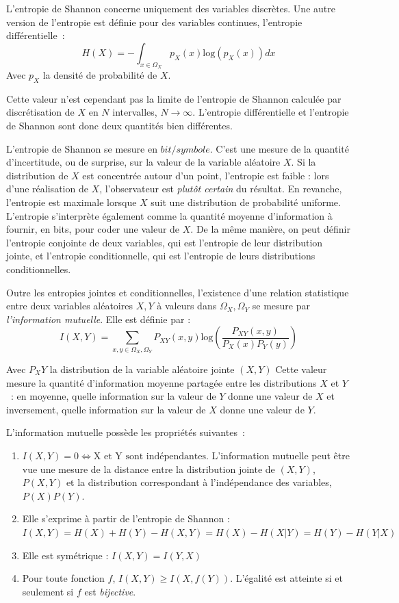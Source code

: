 \documentclass[../main]{subfiles}
\begin{document}
L'entropie de Shannon concerne uniquement des variables discrètes.
Une autre version de l'entropie est définie pour des variables continues, l'entropie différentielle~:
\begin{equation}
    H(X) = - \int_{x \in \Omega_X}{p_X(x)\textrm{log}(p_X(x))dx}
\end{equation}
Avec $p_X$ la densité de probabilité de $X$.
    
Cette valeur n'est cependant pas la limite de l'entropie de Shannon calculée par discrétisation de $X$ en $N$ intervalles, $N \rightarrow \infty$.
L'entropie différentielle et l'entropie de Shannon sont donc deux quantités bien différentes.

L'entropie de Shannon se mesure en $bit/symbole$.
C'est une mesure de la quantité d'incertitude, ou de surprise, sur la valeur de la variable aléatoire $X$. Si la distribution de $X$ est concentrée autour d'un point, l'entropie est faible : lors d'une réalisation de $X$, l'observateur est \emph{plutôt certain} du résultat. En revanche, l'entropie est maximale lorsque $X$ suit une distribution de probabilité uniforme.
L'entropie s'interprète également comme la quantité moyenne d'information à fournir, en bits, pour coder une valeur de $X$.
De la même manière, on peut définir l'entropie conjointe de deux variables, qui est l'entropie de leur distribution jointe, et l'entropie conditionnelle, qui est l'entropie de leurs distributions conditionnelles.

Outre les entropies jointes et conditionnelles, l'existence d'une relation statistique entre deux variables aléatoires $X,Y$ à valeurs dans $\Omega_X,\Omega_Y$ se mesure par \emph{l'information mutuelle}.
Elle est définie par : 
\begin{equation}
 I(X,Y) = \sum_{x,y \in \Omega_X,\Omega_Y}{P_{XY}(x,y)\textrm{log}(\frac{P_{XY}(x,y)}{P_X(x)P_Y(y)})}
\end{equation}

Avec $P_XY$ la distribution de la variable aléatoire jointe $(X,Y)$
Cette valeur mesure la quantité d'information moyenne partagée entre les distributions $X$ et $Y$~: en moyenne, quelle information sur la valeur de $Y$ donne une valeur de $X$ et inversement, quelle information sur la valeur de $X$ donne une valeur de $Y$.

L'information mutuelle possède les propriétés suivantes~:
\begin{enumerate}
\item $I(X,Y) = 0 \Leftrightarrow \textrm{X et Y sont indépendantes}$. L'information mutuelle peut être vue une mesure de la distance entre la distribution jointe de $(X,Y)$, $P(X,Y)$ et la distribution correspondant à l'indépendance des variables, $P(X)P(Y)$.
\item\label{it:h} Elle s'exprime à partir de l'entropie de Shannon : $I(X,Y) = H(X) + H(Y) - H(X,Y) = H(X) - H(X|Y) = H(Y) - H(Y|X)$
\item Elle est symétrique : $I(X,Y) = I(Y,X)$
\item\label{it:eq} Pour toute fonction $f$, $I(X,Y) \geq I(X,f(Y))$. L'égalité est atteinte si et seulement si $f$ est \emph{bijective}.
\end{enumerate}
\end{document}
